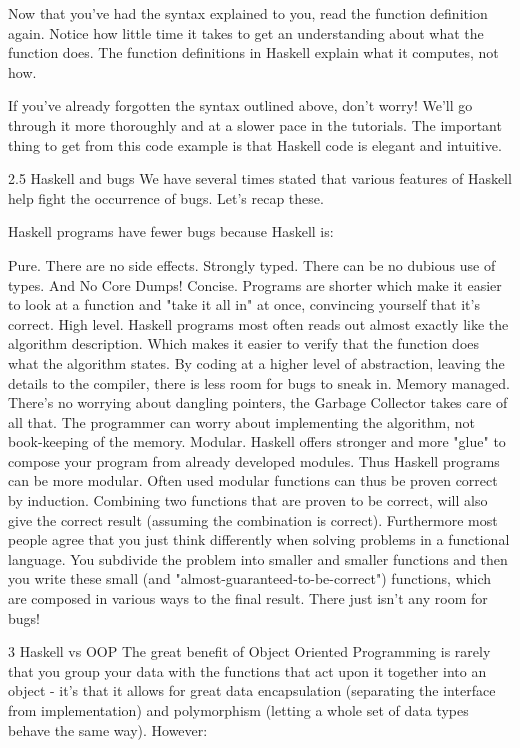 \documentclass{report}
\begin{document}
Now that you've had the syntax explained to you, read the function definition again. Notice how little time it takes to get an understanding about what the function does. The function definitions in Haskell explain what it computes, not how.

If you've already forgotten the syntax outlined above, don't worry! We'll go through it more thoroughly and at a slower pace in the tutorials. The important thing to get from this code example is that Haskell code is elegant and intuitive.

2.5 Haskell and bugs
We have several times stated that various features of Haskell help fight the occurrence of bugs. Let's recap these.

Haskell programs have fewer bugs because Haskell is:

Pure. There are no side effects.
Strongly typed. There can be no dubious use of types. And No Core Dumps!
Concise. Programs are shorter which make it easier to look at a function and "take it all in" at once, convincing yourself that it's correct.
High level. Haskell programs most often reads out almost exactly like the algorithm description. Which makes it easier to verify that the function does what the algorithm states. By coding at a higher level of abstraction, leaving the details to the compiler, there is less room for bugs to sneak in.
Memory managed. There's no worrying about dangling pointers, the Garbage Collector takes care of all that. The programmer can worry about implementing the algorithm, not book-keeping of the memory.
Modular. Haskell offers stronger and more "glue" to compose your program from already developed modules. Thus Haskell programs can be more modular. Often used modular functions can thus be proven correct by induction. Combining two functions that are proven to be correct, will also give the correct result (assuming the combination is correct).
Furthermore most people agree that you just think differently when solving problems in a functional language. You subdivide the problem into smaller and smaller functions and then you write these small (and "almost-guaranteed-to-be-correct") functions, which are composed in various ways to the final result. There just isn't any room for bugs!


3 Haskell vs OOP
The great benefit of Object Oriented Programming is rarely that you group your data with the functions that act upon it together into an object - it's that it allows for great data encapsulation (separating the interface from implementation) and polymorphism (letting a whole set of data types behave the same way). However:
\end{document}
